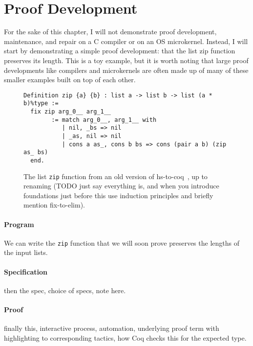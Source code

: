 \section{Proof Development}
\label{sec:mot-dev}

For the sake of this chapter, I will not demonstrate proof development, maintenance, and repair on a C compiler or on an OS microkernel.
Instead, I will start by demonstrating a simple proof development: 
that the list zip function preserves its length.
This is a toy example, but it is worth noting that large proof developments like compilers and microkernels
are often made up of many of these smaller examples built on top of each other.	

\begin{figure}
\begin{lstlisting}
Definition zip {a} {b} : list a -> list b -> list (a * b)%type :=
  fix zip arg_0__ arg_1__
        := match arg_0__, arg_1__ with
           | nil, _bs => nil
           | _as, nil => nil
           | cons a as_, cons b bs => cons (pair a b) (zip as_ bs)
  end.
\end{lstlisting}
\caption{The list \lstinline{zip} function from an old version of hs-to-coq~\cite{TODO}, up to renaming (TODO just say everything is, and when you introduce foundations just before this use induction principles and briefly mention fix-to-elim).}
\label{fig:zip}
\end{figure}

\paragraph{Program}
We can write the \lstinline{zip} function that we will soon prove preserves the lengths of the input lists.

\paragraph{Specification}
then the spec, choice of specs, note here.

\paragraph{Proof}
finally this, interactive process, automation, underlying proof term with highlighting to corresponding tactics,
how Coq checks this for the expected type.

